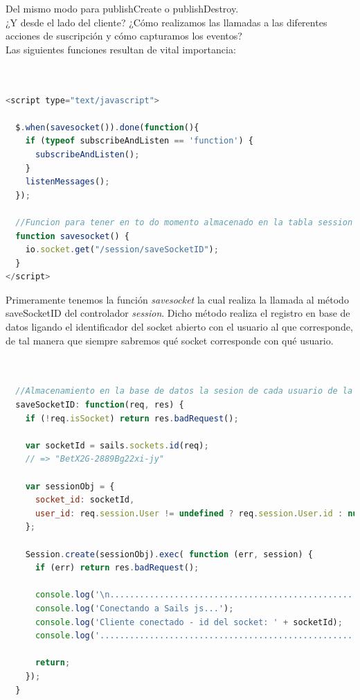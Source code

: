 Del mismo modo para publishCreate o publishDestroy.\\


¿Y desde el lado del cliente? ¿Cómo realizamos las llamadas a las diferentes acciones de suscripción y cómo capturamos los eventos?\\


Las siguientes funciones resultan de vital importancia:\\

\begin{lstlisting}[language=JavaScript]


<script type="text/javascript">

  $.when(savesocket()).done(function(){
    if (typeof subscribeAndListen == 'function') {
      subscribeAndListen();
    }
    listenMessages();
  });

  //Funcion para tener en to do momento almacenado en la tabla session los sockets conectados junto con el usuario al que pertenece
  function savesocket() {
    io.socket.get("/session/saveSocketID");
  }
</script>

\end{lstlisting}


Primeramente tenemos la función \emph{savesocket} la cual realiza la llamada al método saveSocketID del controlador \emph{session}. Dicho método realiza el registro en base de datos ligando el identificador del 
socket abierto con el usuario al que corresponde, de tal manera que siempre sabremos qué socket corresponde con qué usuario.

\begin{lstlisting}[language=JavaScript]


  //Almacenamiento en la base de datos la sesion de cada usuario de la pagina
  saveSocketID: function(req, res) {
    if (!req.isSocket) return res.badRequest();

    var socketId = sails.sockets.id(req);
    // => "BetX2G-2889Bg22xi-jy"

    var sessionObj = {
      socket_id: socketId,
      user_id: req.session.User != undefined ? req.session.User.id : null
    };

    Session.create(sessionObj).exec( function (err, session) {
      if (err) return res.badRequest();

      console.log('\n....................................................');
      console.log('Conectando a Sails js...');
      console.log('Cliente conectado - id del socket: ' + socketId);
      console.log('....................................................');

      return;
    });
  }
  
\end{lstlisting}


